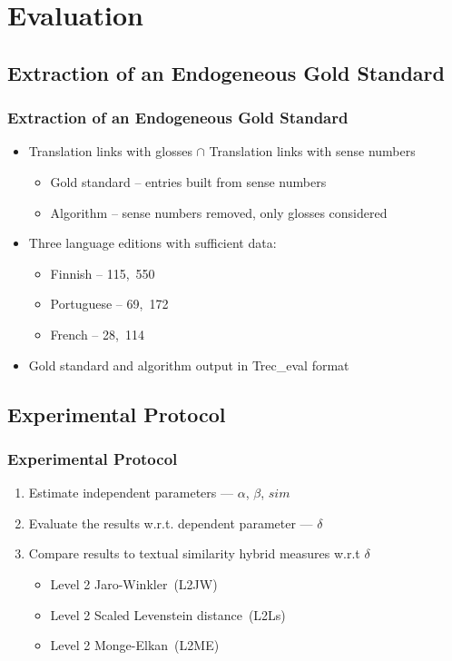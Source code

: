 \documentclass{beamer}
\begin{document}
\section{Evaluation}

\subsection{Extraction of an Endogeneous Gold Standard}
\begin{frame}
	\frametitle{Extraction of an Endogeneous Gold Standard}
	\begin{itemize}
	\item Translation links with glosses $\cap$ Translation links with sense numbers
	\begin{itemize}
		\item Gold standard -- entries built from sense numbers
		\item Algorithm -- sense numbers removed, only glosses considered
	\end{itemize}
	
	\vfill
	
		\item Three language editions with sufficient data:
		\begin{itemize}
			\item Finnish -- 115,~550
			\item Portuguese -- 69,~172
			\item French -- 28,~114
		\end{itemize}
	\vfill
	\item Gold standard and algorithm output in Trec\_eval format
	\end{itemize}
\end{frame}
\subsection{Experimental Protocol}
\begin{frame}
	\frametitle{Experimental Protocol}
	\begin{enumerate}
	\item Estimate independent parameters ---  \(\alpha\), \(\beta\), \(sim\)
	\vfill
	\item Evaluate the results w.r.t. dependent parameter --- \(\delta\)
	\vfill
	\item Compare results to textual similarity hybrid measures w.r.t \(\delta\)
	\begin{itemize}
	\item Level 2 Jaro-Winkler~(L2JW)
	\item Level 2 Scaled Levenstein distance~(L2Ls)
	\item Level 2 Monge-Elkan~(L2ME)
	\end{itemize}
	\end{enumerate}
\end{frame}
\end{document}
